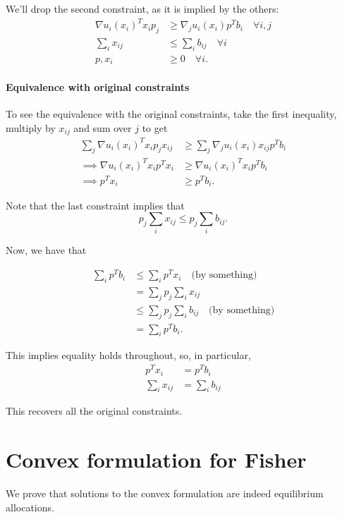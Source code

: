 \documentclass[12pt]{article}
\begin{document}
We'll drop the second constraint, as it is implied by the others:
\begin{align*}
\nabla u_i(x_i)^T x_i p_j &\geq \nabla_j u_i(x_i) p^T b_i\quad \forall i,j \\
\sum_{i} x_{ij} &\leq \sum_{i} b_{ij}\quad \forall i\\
p, x_i &\geq 0\quad \forall i.
\end{align*}

\paragraph{Equivalence with original constraints}
To see the equivalence with the original constraints, take the first inequality,
multiply by $x_{ij}$ and sum over $j$ to get
\begin{align*}
\sum_j \nabla u_i(x_i)^T x_i p_j x_{ij} &\geq \sum_j \nabla_j u_i(x_i) x_{ij} p^T b_i \\
\implies \nabla u_i(x_i)^T x_i p^T x_i &\geq \nabla u_i(x_i)^T x_i p^T b_i \\
\implies p^T x_i &\geq p^T b_i.
\end{align*}

Note that the last constraint implies that
\[
p_j \sum_i x_{ij} \leq p_j \sum_i b_{ij}.
\]

Now, we have that

\begin{align*}
\sum_i p^T b_i &\leq \sum_i p^T x_i\quad \text{(by something)}\\
&= \sum_j p_j \sum_i x_{ij} \\
&\leq \sum_j p_j \sum_i b_{ij}\quad \text{(by something)}\\
&= \sum_i p^T b_i.
\end{align*}

This implies equality holds throughout, so, in particular,
\begin{align*}
p^T x_i &= p^T b_i\\
\sum_i x_{ij} &= \sum_i b_{ij}
\end{align*}

This recovers all the original constraints.

\section{Convex formulation for Fisher}
\label{sec:fisher_proof}
We prove that solutions to the convex formulation %
are indeed equilibrium allocations.
\end{document}
